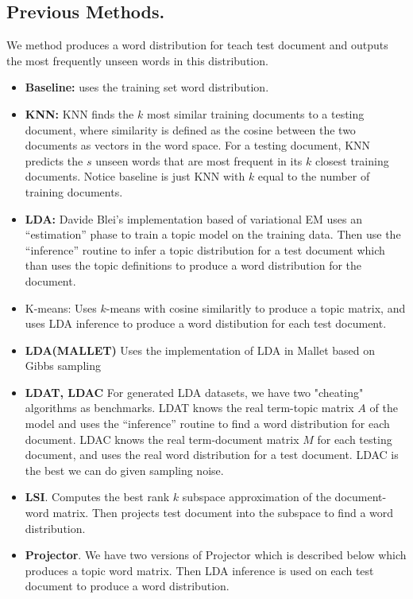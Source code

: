 \subsection{Previous Methods.}

We method produces a word distribution for teach test document and
outputs the most frequently unseen words in this distribution.

\begin{itemize}

\item
{\bf Baseline:} uses the training set word distribution. 

\item
{\bf KNN:} KNN finds the $k$ most similar training documents to a
testing document, where similarity is defined as the cosine between
the two documents as vectors in the word space. For a testing
document, KNN predicts the $s$ unseen words that are most frequent in
its $k$ closest training documents. Notice baseline is just KNN with
$k$ equal to the number of training documents.


\item
{\bf LDA:} Davide Blei's implementation \cite{LDAcode} based of
variational EM uses an ``estimation'' phase to train a topic model on
the training data.  Then use the ``inference'' routine to infer a
topic distribution for a test document which than uses the topic
definitions to produce a word distribution for the document.

\item
{K-means:} Uses $k$-means with cosine similaritly to produce
a topic matrix, and uses LDA inference to produce a word
distibution for each test document. 

\item
{\bf LDA(MALLET)} Uses the implementation of LDA in Mallet
based on Gibbs sampling \cite{McCallumMALLET}

\item {\bf LDAT, LDAC} For generated LDA datasets, we have two
  "cheating" algorithms as benchmarks. LDAT knows the real term-topic
  matrix $A$ of the model and uses the ``inference'' routine to find a
  word distribution for each document.  LDAC knows the real
  term-document matrix $M$ for each testing document, and uses the
  real word distribution for a test document.  LDAC is the best we can
  do given sampling noise.

\item {\bf LSI}.  Computes the best rank $k$ subspace approximation of the document-word
matrix.  Then projects test document into the subspace to find a word distribution.

\item {\bf Projector}. We have two versions of Projector which
is described below which produces a topic word matrix.  Then
LDA inference is used on each test document to produce
a word distribution. 

\end{itemize}

